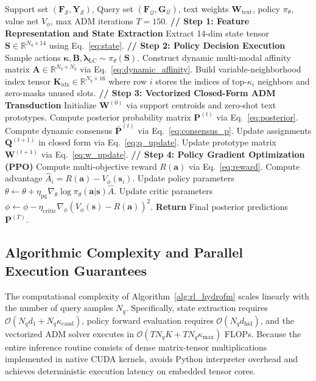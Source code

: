 \begin{algorithm}[t]
\caption{RL-HydroFM Policy Training \& Transductive Adaptation}
\label{alg:rl_hydrofm}
\begin{algorithmic}[1]
\REQUIRE Support set $(\mathbf{F}_{\mathcal{S}}, \mathbf{Y}_{\mathcal{S}})$, Query set $(\mathbf{F}_{\mathcal{Q}}, \mathbf{G}_{\mathcal{Q}})$, text weights $\mathbf{W}_{\text{text}}$, policy $\pi_\theta$, value net $V_\phi$, max ADM iterations $T=150$.
\STATE \textbf{// Step 1: Feature Representation and State Extraction}
\STATE Extract 14-dim state tensor $\mathbf{S} \in \mathbb{R}^{N_q \times 14}$ using Eq.~\eqref{eq:state}.
\STATE \textbf{// Step 2: Policy Decision Execution}
\STATE Sample actions $\bm{\kappa}, \mathbf{B}, \bm{\lambda}_{\text{LC}} \sim \pi_\theta(\mathbf{S})$.
\STATE Construct dynamic multi-modal affinity matrix $\mathbf{A} \in \mathbb{R}^{N_q \times N_q}$ via Eq.~\eqref{eq:dynamic_affinity}.
\STATE Build variable-neighborhood index tensor $\mathbf{K}_{\text{idx}} \in \mathbb{R}^{N_q \times 16}$ where row $i$ stores the indices of top-$\kappa_i$ neighbors and zero-masks unused slots.
\STATE \textbf{// Step 3: Vectorized Closed-Form ADM Transduction}
\STATE Initialize $\mathbf{W}^{(0)}$ via support centroids and zero-shot text prototypes.
    \STATE Compute posterior probability matrix $\mathbf{P}^{(t)}$ via Eq.~\eqref{eq:posterior}.
    \STATE Compute dynamic consensus $\bar{\mathbf{P}}^{(t)}$ via Eq.~\eqref{eq:consensus_p}.
    \STATE Update assignments $\mathbf{Q}^{(t+1)}$ in closed form via Eq.~\eqref{eq:q_update}.
    \STATE Update prototype matrix $\mathbf{W}^{(t+1)}$ via Eq.~\eqref{eq:w_update}.
\ENDFOR
\STATE \textbf{// Step 4: Policy Gradient Optimization (PPO)}
\STATE Compute multi-objective reward $R(\mathbf{a})$ via Eq.~\eqref{eq:reward}.
\STATE Compute advantage $\hat{A}_i = R(\mathbf{a}) - V_\phi(\mathbf{s}_i)$.
\STATE Update policy parameters $\theta \leftarrow \theta + \eta_{\text{pg}} \nabla_\theta \log \pi_\theta(\mathbf{a} | \mathbf{s}) \hat{A}$.
\STATE Update critic parameters $\phi \leftarrow \phi - \eta_{\text{critic}} \nabla_\phi (V_\phi(\mathbf{s}) - R(\mathbf{a}))^2$.
\STATE \textbf{Return} Final posterior predictions $\mathbf{P}^{(T)}$.
\end{algorithmic}
\end{algorithm}

\subsection{Algorithmic Complexity and Parallel Execution Guarantees}
The computational complexity of Algorithm~\ref{alg:rl_hydrofm} scales linearly with the number of query samples $N_q$. Specifically, state extraction requires $\mathcal{O}(N_q d_1 + N_q \kappa_{\text{cand}})$, policy forward evaluation requires $\mathcal{O}(N_q d_{\text{hid}})$, and the vectorized ADM solver executes in $\mathcal{O}(T N_q K + T N_q \kappa_{\max})$ FLOPs. Because the entire inference routine consists of dense matrix-tensor multiplications implemented in native CUDA kernels, \rllctim{} avoids Python interpreter overhead and achieves deterministic execution latency on embedded tensor cores.

